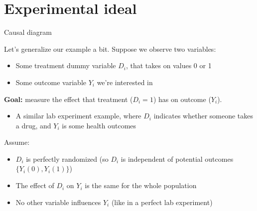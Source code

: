 

\section[Experimental Ideal]{Experimental ideal}
{
\hypersetup{linkcolor=black}
\miniframesoff
\begin{frame}
\tableofcontents[currentsection]
\end{frame}
\miniframeson
}



\begin{frame}[t]{Causal diagram}

\begin{figure}
\end{figure}

Let's generalize our example a bit. Suppose we observe two variables:
\begin{itemize}
    \item Some treatment dummy variable $D_i$, that takes on values 0 or 1
    \item Some outcome variable $Y_i$ we're interested in
\end{itemize}

\vspace{2ex}
\textbf{Goal:} measure the effect that treatment ($D_i = 1$) has on outcome ($Y_i$).
\begin{itemize}
\item A similar lab experiment example,  where $D_i$ indicates whether someone takes a drug,  and $Y_i$ is some health outcomes
\end{itemize}

\vspace{2ex}
Assume:
\begin{itemize}
    \item $D_i$ is perfectly randomized (so $D_i$ is independent of potential outcomes $\{Y_i (0), Y_i (1)\}$)
    \item The effect of $D_i$ on $Y_i$ is the same for the whole population
    \item No other variable influences $Y_i$ (like in a perfect lab experiment) 
\end{itemize}

\end{frame}


